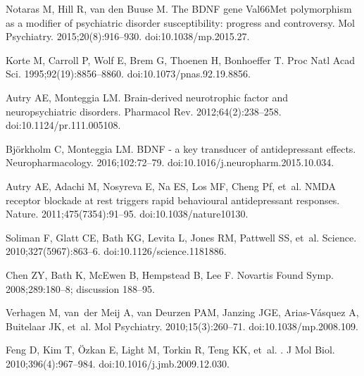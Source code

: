 \documentclass[10pt,letterpaper]{article}
\begin{document}
\begin{thebibliography}{10}
Notaras M, Hill R, {van den Buuse} M.
\newblock The BDNF gene Val66Met polymorphism as a modifier of psychiatric
  disorder susceptibility: progress and controversy.
\newblock Mol Psychiatry. 2015;20(8):916--930.
\newblock doi:{10.1038/mp.2015.27}.

Korte M, Carroll P, Wolf E, Brem G, Thoenen H, Bonhoeffer T.
\newblock Proc Natl Acad Sci. 1995;92(19):8856--8860.
\newblock doi:{10.1073/pnas.92.19.8856}.

Autry AE, Monteggia LM.
\newblock Brain-derived neurotrophic factor and neuropsychiatric disorders.
\newblock Pharmacol Rev. 2012;64(2):238--258.
\newblock doi:{10.1124/pr.111.005108}.

Bj{\"{o}}rkholm C, Monteggia LM.
\newblock BDNF - a key transducer of antidepressant effects.
\newblock Neuropharmacology. 2016;102:72--79.
\newblock doi:{10.1016/j.neuropharm.2015.10.034}.

Autry AE, Adachi M, Nosyreva E, Na ES, Los MF, Cheng Pf, et~al.
\newblock NMDA receptor blockade at rest triggers rapid behavioural
  antidepressant responses.
\newblock Nature. 2011;475(7354):91--95.
\newblock doi:{10.1038/nature10130}.

Soliman F, Glatt CE, Bath KG, Levita L, Jones RM, Pattwell SS, et~al.
\newblock Science. 2010;327(5967):863--6.
\newblock doi:{10.1126/science.1181886}.

Chen ZY, Bath K, McEwen B, Hempstead B, Lee F.
\newblock Novartis Found Symp. 2008;289:180--8; discussion 188--95.

Verhagen M, van~der Meij A, van Deurzen PAM, Janzing JGE, Arias-V{\'{a}}squez
  A, Buitelaar JK, et~al.
\newblock Mol Psychiatry. 2010;15(3):260--71.
\newblock doi:{10.1038/mp.2008.109}.

Feng D, Kim T, {\"{O}}zkan E, Light M, Torkin R, Teng KK, et~al.
.
\newblock J Mol Biol. 2010;396(4):967--984.
\newblock doi:{10.1016/j.jmb.2009.12.030}.


\end{thebibliography}
\end{document}
